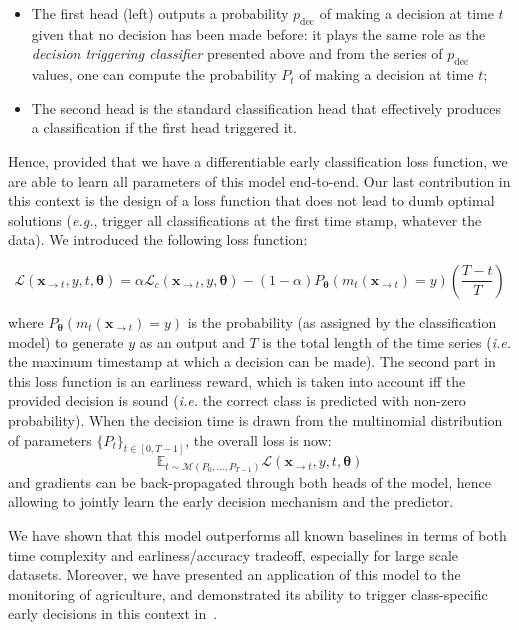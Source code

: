 \begin{itemize}
\item The first head (left) outputs a probability $p_\text{dec}$ of making a
decision at
time $t$ given that no decision has been made before: it plays the same role
as the \emph{decision triggering classifier} presented above and from the series of
$p_\text{dec}$ values, one can compute the probability $P_t$ of making a
decision at time $t$;
\item The second head is the standard classification head that effectively produces
a classification if the first head triggered it.
\end{itemize}

Hence, provided that we have a differentiable early classification loss
function, we are able to learn all parameters of this model end-to-end.
Our last contribution in this context is the design of a loss function that
does not lead to dumb optimal solutions (\emph{e.g.}, trigger all
classifications at
the first time stamp, whatever the data).
We introduced the following loss function:

\begin{equation}
    \mathcal{L}(\mathbf{x}_{\rightarrow t}, y, t, \boldsymbol{\theta}) =
        \alpha \mathcal{L}_c(\mathbf{x}_{\rightarrow t}, y, \boldsymbol{\theta})
            - (1-\alpha) P_{\boldsymbol{\theta}}(m_t(\mathbf{x}_{\rightarrow t})=y)
            \left( \frac{T-t}{T} \right)
\end{equation}

\noindent
where $P_{\boldsymbol{\theta}}(m_t(\mathbf{x}_{\rightarrow t})=y)$ is the
probability (as
assigned by the classification model) to generate $y$ as an output and $T$ is
the total length of the time series (\emph{i.e.} the maximum timestamp at which
a decision can be made).
The second part in this loss function is an earliness reward, which is taken
into account iff the provided decision is sound (\emph{i.e.} the correct class
is
predicted with non-zero probability).
When the decision time is drawn from the
multinomial distribution of parameters $\{P_t\}_{t \in [0, T-1]}$, the overall
loss is now:
\begin{equation}
    \mathbb{E}_{t \sim \mathcal{M}(P_0, \dots , P_{T-1})}
        \mathcal{L}(\mathbf{x}_{\rightarrow t}, y, t, \boldsymbol{\theta})
\end{equation}
and gradients can be back-propagated through both heads of the model, hence
allowing to jointly learn the early decision mechanism and the predictor.

We have shown that this model outperforms all known baselines in terms of both
time complexity and earliness/accuracy tradeoff, especially for large scale
datasets.
Moreover, we have presented an application of this model to the monitoring of
agriculture, and demonstrated its ability to trigger class-specific early
decisions in this context in~\cite{ruwurm:hal-02343851}.
